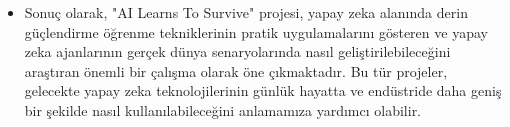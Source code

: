 \documentclass{article}
\begin{document}
\begin{itemize}
\item Sonuç olarak, "AI Learns To Survive" projesi, yapay zeka alanında derin güçlendirme öğrenme tekniklerinin pratik uygulamalarını gösteren ve yapay zeka ajanlarının gerçek dünya senaryolarında nasıl geliştirilebileceğini araştıran önemli bir çalışma olarak öne çıkmaktadır. Bu tür projeler, gelecekte yapay zeka teknolojilerinin günlük hayatta ve endüstride daha geniş bir şekilde nasıl kullanılabileceğini anlamamıza yardımcı olabilir.
\end{itemize}
\newpage


\end{document}
